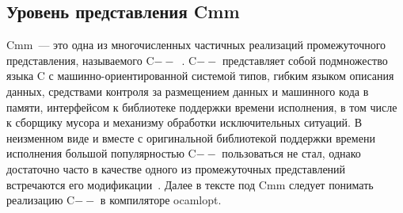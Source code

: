 \documentclass[a4paper, 12pt]{article}
\begin{document}
\subsection{Уровень представления Cmm}
Cmm~--- это одна из многочисленных частичных реализаций промежуточного представления, называемого C$--$~\cite{CmmDesc,
CmmSpec}. C$--$ представляет собой подмножество языка C с машинно-ориентированной системой типов, гибким языком описания
данных, средствами контроля за размещением данных и машинного кода в памяти, интерфейсом к библиотеке поддержки времени
исполнения, в том числе к сборщику мусора и механизму обработки исключительных ситуаций. В неизменном виде и вместе с
оригинальной библиотекой поддержки времени исполнения большой популярностью C$--$ пользоваться не стал, однако
достаточно часто в качестве одного из промежуточных представлений встречаются его модификации~\cite{GHC}. Далее в тексте
под Cmm следует понимать реализацию C$--$ в компиляторе ocamlopt.
\end{document}
